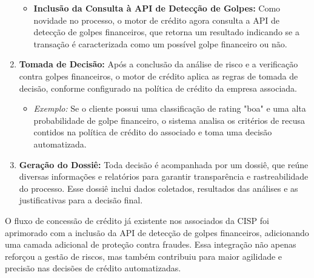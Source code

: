 \documentclass[12pt,a4paper]{article}
\begin{document}
\begin{enumerate}
\begin{itemize}
        \item \textbf{Inclusão da Consulta à API de Detecção de Golpes:} 
        Como novidade no processo, o motor de crédito agora consulta a API de detecção de golpes financeiros, que retorna um resultado indicando se a transação é caracterizada como um possível golpe financeiro ou não.
    \end{itemize}

    \item \textbf{Tomada de Decisão:} 
    Após a conclusão da análise de risco e a verificação contra golpes financeiros, o motor de crédito aplica as regras de tomada de decisão, conforme configurado na política de crédito da empresa associada.
    \begin{itemize}
        \item \textit{Exemplo:} Se o cliente possui uma classificação de rating "boa" e uma alta probabilidade de golpe financeiro, o sistema analisa os critérios de recusa contidos na política de crédito do associado e toma uma decisão automatizada.
    \end{itemize}

    \item \textbf{Geração do Dossiê:} 
    Toda decisão é acompanhada por um dossiê, que reúne diversas informações e relatórios para garantir transparência e rastreabilidade do processo. Esse dossiê inclui dados coletados, resultados das análises e as justificativas para a decisão final.
\end{enumerate}

O fluxo de concessão de crédito já existente nos associados da CISP foi aprimorado com a inclusão da API de detecção de golpes financeiros, adicionando uma camada adicional de proteção contra fraudes. Essa integração não apenas reforçou a gestão de riscos, mas também contribuiu para maior agilidade e precisão nas decisões de crédito automatizadas.

\newpage

\end{document}
